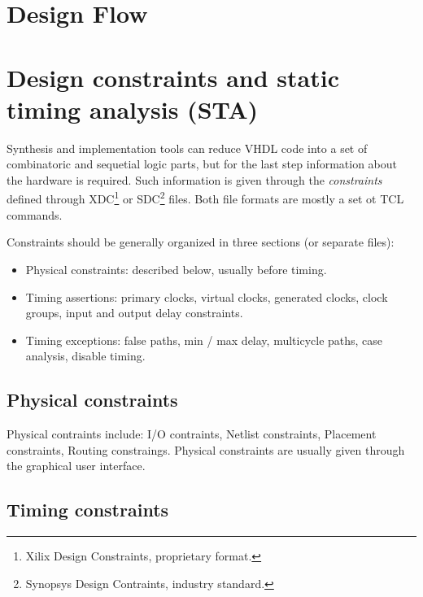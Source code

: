 \documentclass[margin=small]{tex/hsrzf}
\begin{document}
\section{Design Flow}

\section{Design constraints and static timing analysis (STA)}

Synthesis and implementation tools can reduce VHDL code into a set of combinatoric and sequetial logic parts, but for the last step information about the hardware is required. Such information is given through the \emph{constraints} defined through XDC\footnote{Xilix Design Constraints, proprietary format.}  or SDC\footnote{Synopsys Design Contraints, industry standard.} files. Both file formats are mostly a set ot TCL commands.

Constraints should be generally organized in three sections (or separate files):
\begin{itemize}
  \item Physical constraints: described below, usually before timing.
  \item Timing assertions: primary clocks, virtual clocks, generated clocks, clock groups, input and output delay constraints.
  \item Timing exceptions: false paths, min / max delay, multicycle paths, case analysis, disable timing.
\end{itemize}

\subsection{Physical constraints}

Physical contraints include: I/O contraints, Netlist constraints, Placement constraints, Routing constraings. Physical constraints are usually given through the graphical user interface.

\subsection{Timing constraints}

\end{document}
